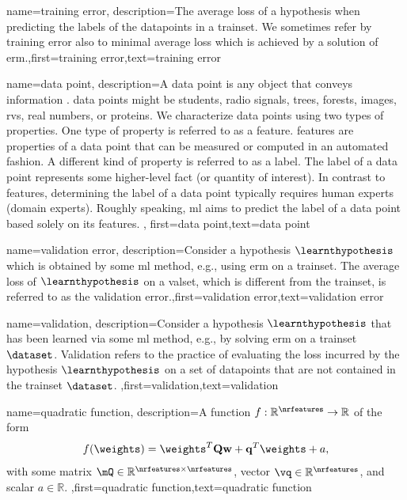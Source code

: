 {{
{
	name={training error},
	description={The average \gls{loss} of a \gls{hypothesis} when 
		predicting the \gls{label}s of the \gls{datapoint}s in a \gls{trainset}. 
		We sometimes refer by training error also to minimal average \gls{loss} 
		which is achieved by a solution of \gls{erm}.},first={training error},text={training error}  
}

{name={data point},
description={A \gls{data} point is any object that conveys information \cite{coverthomas}. \Gls{data} points might be 
		students, radio signals, trees, forests, images, \gls{rv}s, real numbers, or proteins. We characterize \gls{data} points 
		using two types of properties. One type of property is referred to as a \gls{feature}. \Gls{feature}s are properties of a 
		\gls{data} point that can be measured or computed in an automated fashion. 
		A different kind of property is referred to as a \gls{label}. The \gls{label} of 
		a \gls{data} point represents some higher-level fact (or quantity of interest). In 
		contrast to \gls{feature}s, determining the \gls{label} of a \gls{data} point typically 
		requires human experts (domain experts). Roughly speaking, \gls{ml} aims to predict 
		the \gls{label} of a \gls{data} point based solely on its \gls{feature}s. 
		}, first={data point},text={data point}  
}


{name={validation error},
 description={Consider a \gls{hypothesis} $\learnthypothesis$ which is 
 	obtained by some \gls{ml} method, e.g., using \gls{erm} on a \gls{trainset}. The average \gls{loss} 
 	of $\learnthypothesis$ on a \gls{valset}, which is different from the \gls{trainset}, is referred 
 	to as the \gls{validation} error.},first={validation error},text={validation error}  
}

{name={validation},
	description={Consider a \gls{hypothesis} $\learnthypothesis$ that has been 
		learned via some \gls{ml} method, e.g., by solving \gls{erm} on a \gls{trainset} $\dataset$. 
		Validation refers to the practice of evaluating the \gls{loss} incurred by the 
		\gls{hypothesis} $\learnthypothesis$ on a set of 
		\gls{datapoint}s that are not contained in the \gls{trainset} $\dataset$. },first={validation},text={validation}  
}

{name={quadratic function},
	description={A function $f: \mathbb{R}^{\nrfeatures} \rightarrow \mathbb{R}$ of the form 
	$$f(\weights) =  \weights^{T} \mathbf{Q} \mathbf{w} + \mathbf{q}^{T} \weights+a,$$ with 
	some matrix $\mQ \in \mathbb{R}^{\nrfeatures \times \nrfeatures}$, vector $\vq \in \mathbb{R}^{\nrfeatures}$, 
	and scalar $a \in \mathbb{R}$.  },first={quadratic function},text={quadratic function}  
}

}}
